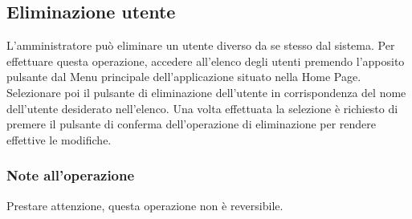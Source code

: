 	\subsection{Eliminazione utente}
	L'amministratore può eliminare un utente diverso da se stesso dal sistema.
	Per effettuare questa operazione, accedere all'elenco degli utenti premendo l'apposito pulsante dal Menu principale dell'applicazione situato nella Home Page.
	Selezionare poi il pulsante di eliminazione dell'utente in corrispondenza del nome dell'utente desiderato nell'elenco.
	Una volta effettuata la selezione è richiesto di premere il pulsante di conferma dell'operazione di eliminazione per rendere effettive le modifiche.
	\subsubsection{Note all'operazione}	
	Prestare attenzione, questa operazione non è reversibile.
		

